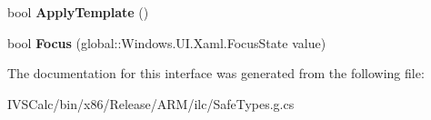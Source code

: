 \begin{DoxyCompactItemize}
\item 
\mbox{\label{interface_windows_1_1_u_i_1_1_xaml_1_1_controls_1_1_i_control_a68feca69bd9c95b33c4636574e86d05d}} 
bool {\bfseries Apply\+Template} ()
\item 
\mbox{\label{interface_windows_1_1_u_i_1_1_xaml_1_1_controls_1_1_i_control_a7c98017d582493146cd685fc022b8bcb}} 
bool {\bfseries Focus} (global\+::\+Windows.\+U\+I.\+Xaml.\+Focus\+State value)
\end{DoxyCompactItemize}


The documentation for this interface was generated from the following file\+:\begin{DoxyCompactItemize}
\item 
I\+V\+S\+Calc/bin/x86/\+Release/\+A\+R\+M/ilc/Safe\+Types.\+g.\+cs\end{DoxyCompactItemize}
